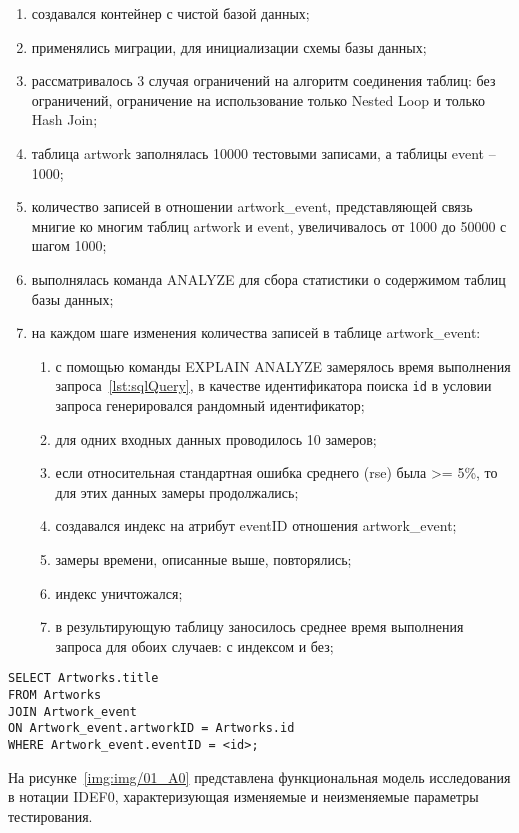 \begin{enumerate}[label={\arabic*)}]
	\item создавался контейнер с чистой базой данных;
	\item применялись миграции, для инициализации схемы базы данных;
	\item рассматривалось 3 случая ограничений на алгоритм соединения таблиц: без ограничений, ограничение на использование только Nested Loop и только Hash Join;
	\item таблица artwork заполнялась 10000 тестовыми записами, а таблицы event -- 1000;
	\item количество записей в отношении artwork\_event, представляющей связь мнигие ко многим таблиц artwork и event, увеличивалось от 1000 до 50000 с шагом 1000;
	\item выполнялась команда ANALYZE для сбора статистики о содержимом таблиц базы данных;
	\item на каждом шаге изменения количества записей в таблице artwork\_event:
	\begin{enumerate}[label={\alph*)}]
		\item с помощью команды EXPLAIN ANALYZE замерялось время выполнения запроса~\ref{lst:sqlQuery}, в качестве идентификатора поиска \texttt{id} в условии запроса генерировался рандомный идентификатор;
		\item для одних входных данных проводилось 10 замеров;
		\item если относительная стандартная ошибка среднего (rse) была >= 5\%, то для этих данных замеры продолжались;
		\item создавался индекс на атрибут eventID отношения artwork\_event;
		\item замеры времени, описанные выше, повторялись;
		\item индекс уничтожался;
		\item в результирующую таблицу заносилось среднее время выполнения запроса для обоих случаев: с индексом и без;
	\end{enumerate}
\end{enumerate}

\begin{lstlisting}[style=sql, caption={SQL-запрос}, label=lst:sqlQuery]
SELECT Artworks.title
FROM Artworks
JOIN Artwork_event
ON Artwork_event.artworkID = Artworks.id
WHERE Artwork_event.eventID = <id>;
\end{lstlisting}

На рисунке~\ref{img:img/01_A0} представлена функциональная модель исследования в нотации IDEF0, характеризующая изменяемые и неизменяемые параметры тестирования.

